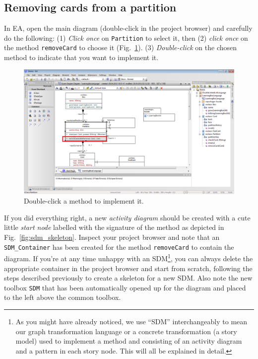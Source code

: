 \subsection{Removing cards from a partition}

In EA, open the main diagram (double-click in the project browser) and carefully do the following: (1) \emph{Click once} on \texttt{Partition} to select it, then (2) \emph{click once} on the method \texttt{removeCard} to choose it (Fig.~\ref{fig:sdm_start}). 
(3) \emph{Double-click} on the chosen method to indicate that you want to implement it.

\begin{figure}[htp]
\begin{center}
  \includegraphics[width=\textwidth]{pics/sdmBilder/removeCard/sdm01RAW}
  \caption{Double-click a method to implement it.}  
  \label{fig:sdm_start}
\end{center}
\end{figure}
 
If you did everything right, a new \emph{activity diagram} should be created  with a cute little \emph{start node} labelled with the signature of the method  as depicted in Fig.~\ref{fig:sdm_skeleton}.  Inspect your project browser and note that an \texttt{SDM\_Container} has been created for the method \texttt{removeCard} to contain the diagram.  
If you're at any time unhappy with an SDM\footnote{As you might have already noticed, we use ``SDM'' interchangeably to mean our graph transformation language or a concrete transformation (a story model) used to implement a method and consisting of an activity diagram and a pattern in each story node.  
This will all be explained in detail.}, you can always delete the appropriate container in the project browser and start from scratch, following the steps described previously to create a skeleton for a new SDM.  
Also note the new  toolbox \texttt{SDM} that has been automatically opened up for the diagram and placed to the left above the common toolbox. 


